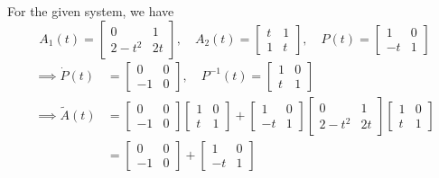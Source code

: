 For the given system, we have
\[
    A_1(t) =
    \begin{bmatrix}
        0       & 1  \\
        2 - t^2 & 2t
    \end{bmatrix}, \quad
    A_2(t) =
    \begin{bmatrix}
        t & 1 \\
        1 & t
    \end{bmatrix}, \quad
    P(t) =
    \begin{bmatrix}
        1  & 0 \\
        -t & 1
    \end{bmatrix}
\]
\begin{align*}
    \implies
    \dot{P}(t)
     & =
    \begin{bmatrix}
        0  & 0 \\
        -1 & 0
    \end{bmatrix}
    , \quad
    P^{-1}(t)
    =
    \begin{bmatrix}
        1 & 0 \\
        t & 1
    \end{bmatrix}
    \\
    \implies
    \tilde{A}(t)
     & =
    \begin{bmatrix}
        0  & 0 \\
        -1 & 0
    \end{bmatrix}
    \begin{bmatrix}
        1 & 0 \\
        t & 1
    \end{bmatrix}
    +
    \begin{bmatrix}
        1  & 0 \\
        -t & 1
    \end{bmatrix}
    \begin{bmatrix}
        0       & 1  \\
        2 - t^2 & 2t
    \end{bmatrix}
    \begin{bmatrix}
        1 & 0 \\
        t & 1
    \end{bmatrix}
    \\ & =
    \begin{bmatrix}
        0  & 0 \\
        -1 & 0
    \end{bmatrix}
    +
    \begin{bmatrix}
        1  & 0 \\
        -t & 1

\end{bmatrix}
\end{align*}
